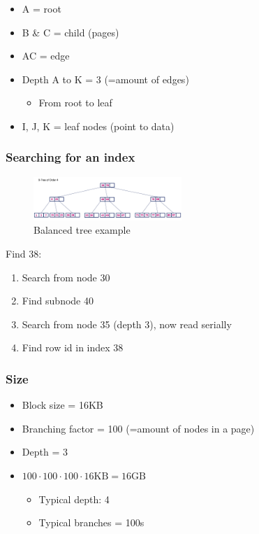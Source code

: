 \documentclass{article}
\begin{document}
\begin{itemize}
    \item A = root
    \item B \& C = child (pages)
    \item AC = edge
    \item Depth A to K = 3 (=amount of edges)
    \begin{itemize}
        \item From root to leaf
    \end{itemize}
    \item I, J, K = leaf nodes (point to data)
\end{itemize}

\subsubsection{Searching for an index}

\begin{figure}[H]
    \centering
    \includegraphics[width=0.5\textwidth]{balanced-tree-index.png}
    \caption{Balanced tree example}
\end{figure}

Find 38:

\begin{enumerate}
    \item Search from node 30
    \item Find subnode 40
    \item Search from node 35 (depth 3), now read serially
    \item Find row id in index 38
\end{enumerate}

\subsubsection{Size}

\begin{itemize}
    \item Block size = 16KB
    \item Branching factor = 100 (=amount of nodes in a page)
    \item Depth = 3
    \item $100 \cdot 100 \cdot 100 \cdot 16\text{KB} = 16\text{GB}$
    \begin{itemize}
        \item Typical depth: 4
        \item Typical branches = 100s
    \end{itemize}
\end{itemize}
\end{document}
